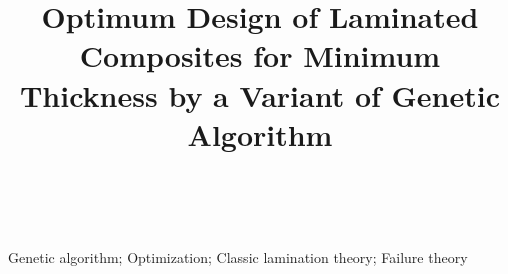 \documentclass[twocolumn]{IEEEtran}
\begin{document}
%
\title{Optimum Design of Laminated Composites for Minimum Thickness by a Variant
of Genetic Algorithm}


\author{\\
}



\maketitle



\begin{abstract}
	
\end{abstract}

\begin{IEEEkeywords}
Genetic algorithm; Optimization; Classic lamination theory; Failure theory
\end{IEEEkeywords}


%
\IEEEpeerreviewmaketitle













\end{document}
